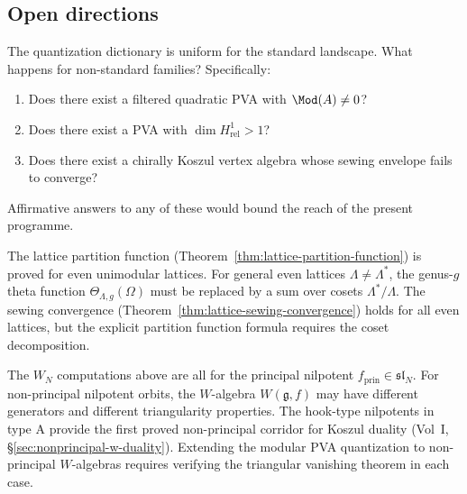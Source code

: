 \subsection{Open directions}

\begin{question}
The quantization dictionary is uniform for the standard landscape.
What happens for non-standard families? Specifically:
\begin{enumerate}[leftmargin=2.4em]
\item Does there exist a filtered quadratic PVA with
$\Mod(A) \neq 0$?

\item Does there exist a PVA with $\dim H^1_{\mathrm{rel}} > 1$?

\item Does there exist a chirally Koszul vertex algebra whose
sewing envelope fails to converge?
\end{enumerate}
Affirmative answers to any of these would bound the reach of the
present programme.
\end{question}

\begin{question}
The lattice partition function (Theorem~\ref{thm:lattice-partition-function})
is proved for even unimodular lattices. For general even lattices
$\Lambda \neq \Lambda^*$, the genus-$g$ theta function
$\Theta_{\Lambda,g}(\Omega)$ must be replaced by a sum over cosets
$\Lambda^*/\Lambda$. The sewing convergence
(Theorem~\ref{thm:lattice-sewing-convergence}) holds for all even lattices,
but the explicit partition function formula requires the coset
decomposition.
\end{question}

\begin{question}
The $W_N$ computations above are all for the principal nilpotent
$f_{\mathrm{prin}} \in \mathfrak{sl}_N$. For non-principal nilpotent
orbits, the $W$-algebra $W(\mathfrak{g}, f)$ may have different
generators and different triangularity properties. The hook-type
nilpotents in type A provide the first proved non-principal corridor
for Koszul duality
(Vol~I, \S\ref*{sec:nonprincipal-w-duality}).
Extending the modular PVA quantization to non-principal $W$-algebras
requires verifying the triangular vanishing theorem in each case.
\end{question}

